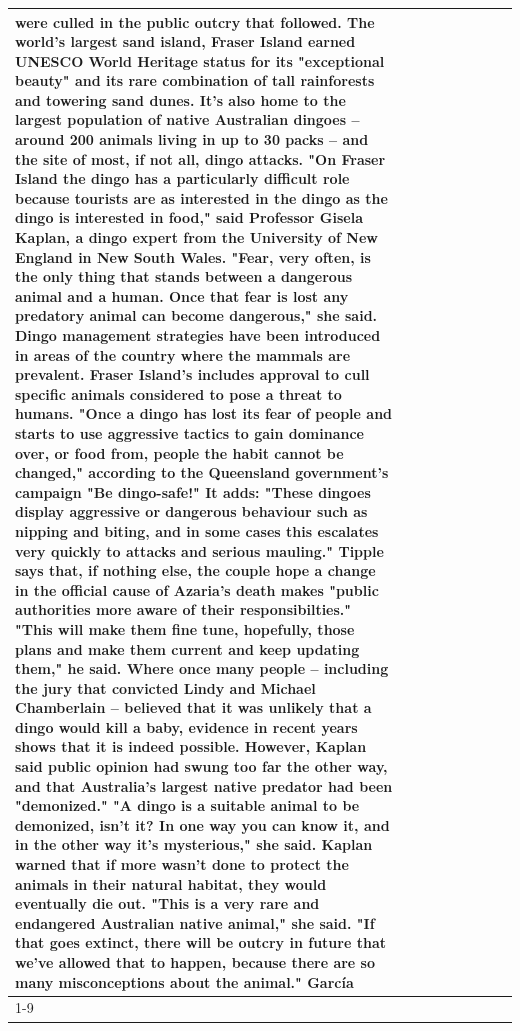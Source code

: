 \begin{table}[H]
\begin{tabular}{lllrlllll}
were culled in the public outcry that followed. The world's largest sand island, Fraser Island earned UNESCO World Heritage status for its "exceptional beauty" and its rare combination of tall rainforests and towering sand dunes. It's also home to the largest population of native Australian dingoes -- around 200 animals living in up to 30 packs -- and the site of most, if not all, dingo attacks. "On Fraser Island the dingo has a particularly difficult role because tourists are as interested in the dingo as the dingo is interested in food," said Professor Gisela Kaplan, a dingo expert from the University of New England in New South Wales. "Fear, very often, is the only thing that stands between a dangerous animal and a human. Once that fear is lost any predatory animal can become dangerous," she said. Dingo management strategies have been introduced in areas of the country where the mammals are prevalent. Fraser Island's includes approval to cull specific animals considered to pose a threat to humans. "Once a dingo has lost its fear of people and starts to use aggressive tactics to gain dominance over, or food from, people the habit cannot be changed," according to the Queensland government's campaign "Be dingo-safe!" It adds: "These dingoes display aggressive or dangerous behaviour such as nipping and biting, and in some cases this escalates very quickly to attacks and serious mauling." Tipple says that, if nothing else, the couple hope a change in the official cause of Azaria's death makes "public authorities more aware of their responsibilties." "This will make them fine tune, hopefully, those plans and make them current and keep updating them," he said. Where once many people -- including the jury that convicted Lindy and Michael Chamberlain -- believed that it was unlikely that a dingo would kill a baby, evidence in recent years shows that it is indeed possible. However, Kaplan said public opinion had swung too far the other way, and that Australia's largest native predator had been "demonized." "A dingo is a suitable animal to be demonized, isn't it? In one way you can know it, and in the other way it's mysterious," she said. Kaplan warned that if more wasn't done to protect the animals in their natural habitat, they would eventually die out. "This is a very rare and endangered Australian native animal," she said. "If that goes extinct, there will be outcry in future that we've allowed that to happen, because there are so many misconceptions about the animal." García \\
\cline{1-9}

\end{tabular}
\end{table}
